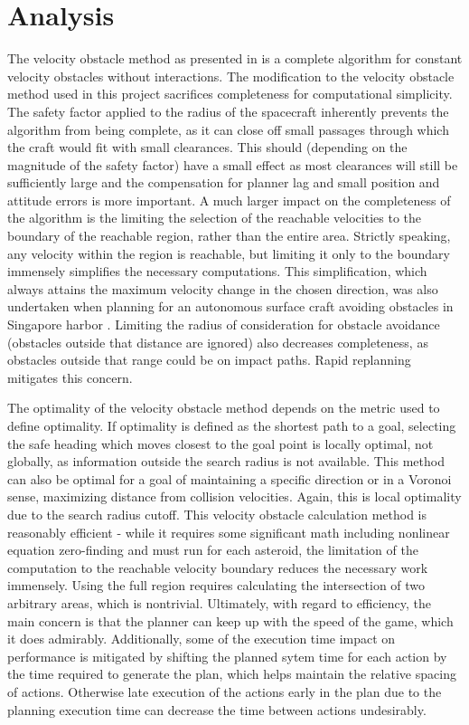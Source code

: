 \documentclass[10pt,final,conference]{IEEEtran}
\begin{document}
\section{Analysis}

The velocity obstacle method as presented in \cite{fiorini1998motion} is a complete algorithm for constant velocity obstacles without interactions. The modification to the velocity obstacle method used in this project sacrifices completeness for computational simplicity. The safety factor applied to the radius of the spacecraft inherently prevents the algorithm from being complete, as it can close off small passages through which the craft would fit with small clearances. This should (depending on the magnitude of the safety factor) have a small effect as most clearances will still be sufficiently large and the compensation for planner lag and small position and attitude errors is more important. A much larger impact on the completeness of the algorithm is the limiting the selection of the reachable velocities to the boundary of the reachable region, rather than the entire area. Strictly speaking, any velocity within the region is reachable, but limiting it only to the boundary immensely simplifies the necessary computations. This simplification, which always attains the maximum velocity change in the chosen direction, was also undertaken when planning for an autonomous surface craft avoiding obstacles in Singapore harbor \citep{bandyophadyay2010simple}. Limiting the radius of consideration for obstacle avoidance (obstacles outside that distance are ignored) also decreases completeness, as obstacles outside that range could be on impact paths. Rapid replanning mitigates this concern.

The optimality of the velocity obstacle method depends on the metric used to define optimality. If optimality is defined as the shortest path to a goal, selecting the safe heading which moves closest to the goal point is locally optimal, not globally, as information outside the search radius is not available. This method can also be optimal for a goal of maintaining a specific direction or in a Voronoi sense, maximizing distance from collision velocities. Again, this is local optimality due to the search radius cutoff. This velocity obstacle calculation method is reasonably efficient - while it requires some significant math including nonlinear equation zero-finding and must run for each asteroid, the limitation of the computation to the reachable velocity boundary reduces the necessary work immensely. Using the full region requires calculating the intersection of two arbitrary areas, which is nontrivial. Ultimately, with regard to efficiency, the main concern is that the planner can keep up with the speed of the game, which it does admirably. Additionally, some of the execution time impact on performance is mitigated by shifting the planned sytem time for each action by the time required to generate the plan, which helps maintain the relative spacing of actions. Otherwise late execution of the actions early in the plan due to the planning execution time can decrease the time between actions undesirably.
\end{document}
